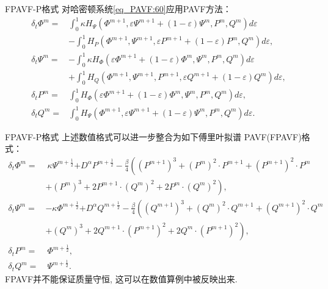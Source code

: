 \documentclass[aspectratio=169]{beamer}
\numberwithin{theorem}{section} %
\begin{document}
\begin{frame}{FPAVF-P格式}
	对哈密顿系统\eqref{eq_PAVF:60}应用PAVF方法：
	\begin{align}
	\delta_{t} \varPhi^{m}=&\int_{0}^{1}\kappa H_{\Psi}\left(\varPhi^{m+1}, \varepsilon \Psi^{m+1}+(1-\varepsilon) \Psi^{m}, P^{m}, Q^{m}\right)d \varepsilon\nonumber\\
	&-\int_{0}^{1}H_{P}\left(\varPhi^{m+1}, \Psi^{m+1}, \varepsilon P^{m+1}+(1-\varepsilon) P^{m}, Q^{m}\right)d \varepsilon,\label{eq_PAVF:70}\\
	\delta_{t} \Psi^{m}=&-\int_{0}^{1}\kappa H_{\varPhi}\left(\varepsilon \varPhi^{m+1}+(1-\varepsilon) \varPhi^{m}, \Psi^{m}, P^{m}, Q^{m}\right)d \varepsilon\nonumber\\
	&+\int_{0}^{1}H_{Q}\left(\varPhi^{m+1}, \Psi^{m+1}, P^{m+1}, \varepsilon Q^{m+1}+(1-\varepsilon) Q^{m}\right)d\varepsilon,\label{eq_PAVF:71}\\
	\delta_{t} P^{m}=&\int_{0}^{1}H_{\varPhi}\left(\varepsilon \varPhi^{m+1}+(1-\varepsilon) \varPhi^{m}, \Psi^{m}, P^{m}, Q^{m}\right) d \varepsilon,\label{eq_PAVF:72}\\
	\delta_{t} Q^{m}=&\int_{0}^{1}H_{\Psi}\left(\varPhi^{m+1}, \varepsilon \Psi^{m+1}+(1-\varepsilon) \Psi^{m}, P^{m}, Q^{m}\right) d \varepsilon.\label{eq_PAVF:73}
	\end{align}
\end{frame}

\begin{frame}{FPAVF-P格式}
	上述数值格式可以进一步整合为如下傅里叶拟谱 PAVF(FPAVF)格式：
	\begin{align}
	\delta_{t} \varPhi^{m}=&~\kappa \Psi^{m+\frac{1}{2}}{+D^{\alpha} P^{m+\frac{1}{2}}}-\frac{\beta}{4}\left( (P^{m+1})^3+ (P^{m})^{2}\cdot P^{m+1}+(P^{m+1})^{2}\cdot P^{m}\right.\nonumber\\
		&+\left. (P^{m})^{3}+2 P^{m+1}\cdot (Q^{m})^{2}+2 P^{m}\cdot (Q^{m})^{2}\right),\label{eq_PAVF:74}\\
	\delta_{t} \Psi^{m}=&-\kappa \varPhi^{m+\frac{1}{2}}{+D^{\alpha} Q^{m+\frac{1}{2}}}-\frac{\beta}{4}\left( (Q^{m+1})^3+ (Q^{m})^{2}\cdot Q^{m+1}+(Q^{m+1})^{2}\cdot Q^{m}\right.\nonumber\\
		&+\left. (Q^{m})^{3}+2 Q^{m+1}\cdot (P^{m+1})^{2}+2 Q^{m}\cdot (P^{m+1})^{2}\right),\label{eq_PAVF:75}\\
	\delta_{t} P^{m}=&~\varPhi^{m+\frac{1}{2}},\label{eq_PAVF:76}\\
	\delta_{t} Q^{m}=&~\Psi^{m+\frac{1}{2}}.\label{eq_PAVF:77}
	\end{align}
	FPAVF并不能保证质量守恒, 这可以在数值算例中被反映出来.
\end{frame}
\end{document}
